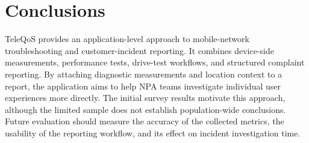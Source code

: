 \documentclass[conference]{IEEEtran}
\begin{document}
\section{Conclusions}
TeleQoS provides an application-level approach to mobile-network troubleshooting and customer-incident reporting. It combines device-side measurements, performance tests, drive-test workflows, and structured complaint reporting. By attaching diagnostic measurements and location context to a report, the application aims to help NPA teams investigate individual user experiences more directly. The initial survey results motivate this approach, although the limited sample does not establish population-wide conclusions. Future evaluation should measure the accuracy of the collected metrics, the usability of the reporting workflow, and its effect on incident investigation time.



\end{document}
